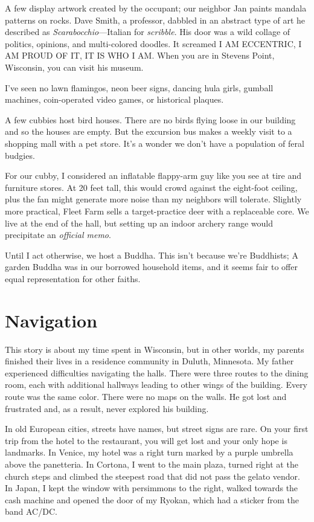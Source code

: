 \documentclass[
  letterpaper,
  DIV=11,
  numbers=noendperiod]{scrreprt}
\begin{document}
A few display artwork created by the occupant; our neighbor Jan paints
mandala patterns on rocks. Dave Smith, a professor, dabbled in an
abstract type of art he described as \emph{Scarabocchio}---Italian for
\emph{scribble}. His door was a wild collage of politics, opinions, and
multi-colored doodles. It screamed I AM ECCENTRIC, I AM PROUD OF IT, IT
IS WHO I AM. When you are in Stevens Point, Wisconsin, you can visit his
museum.

I've seen no lawn flamingos, neon beer signs, dancing hula girls,
gumball machines, coin-operated video games, or historical plaques.

A few cubbies host bird houses. There are no birds flying loose in our
building and so the houses are empty. But the excursion bus makes a
weekly visit to a shopping mall with a pet store. It's a wonder we don't
have a population of feral budgies.

For our cubby, I considered an inflatable flappy-arm guy like you see at
tire and furniture stores. At 20 feet tall, this would crowd against the
eight-foot ceiling, plus the fan might generate more noise than my
neighbors will tolerate. Slightly more practical, Fleet Farm sells a
target-practice deer with a replaceable core. We live at the end of the
hall, but setting up an indoor archery range would precipitate an
\emph{official memo}.

Until I act otherwise, we host a Buddha. This isn't because we're
Buddhists; A garden Buddha was in our borrowed household items, and it
seems fair to offer equal representation for other faiths.

\section*{Navigation}\label{navigation}


This story is about my time spent in Wisconsin, but in other worlds, my
parents finished their lives in a residence community in Duluth,
Minnesota. My father experienced difficulties navigating the halls.
There were three routes to the dining room, each with additional
hallways leading to other wings of the building. Every route was the
same color. There were no maps on the walls. He got lost and frustrated
and, as a result, never explored his building.

In old European cities, streets have names, but street signs are rare.
On your first trip from the hotel to the restaurant, you will get lost
and your only hope is landmarks. In Venice, my hotel was a right turn
marked by a purple umbrella above the panetteria. In Cortona, I went to
the main plaza, turned right at the church steps and climbed the
steepest road that did not pass the gelato vendor. In Japan, I kept the
window with persimmons to the right, walked towards the cash machine and
opened the door of my Ryokan, which had a sticker from the band AC/DC.
\end{document}
